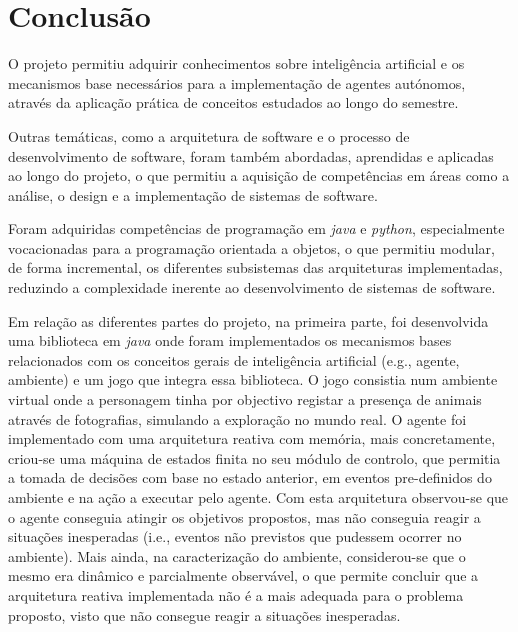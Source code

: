 \chapter{Conclusão}\label{ch:conclusao}

O projeto permitiu adquirir conhecimentos sobre inteligência artificial e os mecanismos base necessários para a implementação de agentes autónomos, através da aplicação prática de conceitos estudados ao longo do semestre.

Outras temáticas, como a arquitetura de software e o processo de desenvolvimento de software, foram também abordadas, aprendidas e aplicadas ao longo do projeto, o que permitiu a aquisição de competências em áreas como a análise, o design e a implementação de sistemas de software.

Foram adquiridas competências de programação em \textit{java} e \textit{python}, especialmente vocacionadas para a programação orientada a objetos, o que permitiu modular, de forma incremental, os diferentes subsistemas das arquiteturas implementadas, reduzindo a complexidade inerente ao desenvolvimento de sistemas de software.

Em relação as diferentes partes do projeto, na primeira parte, foi desenvolvida uma biblioteca em \textit{java} onde foram implementados os mecanismos bases relacionados com os conceitos gerais de inteligência artificial (e.g., agente, ambiente) e um jogo que integra essa biblioteca.
O jogo consistia num ambiente virtual onde a personagem tinha por objectivo registar a presença de animais através de fotografias, simulando a exploração no mundo real.
O agente foi implementado com uma arquitetura reativa com memória, mais concretamente, criou-se uma máquina de estados finita no seu módulo de controlo, que permitia a tomada de decisões com base no estado anterior, em eventos pre-definidos do ambiente e na ação a executar pelo agente.
Com esta arquitetura observou-se que o agente conseguia atingir os objetivos propostos, mas não conseguia reagir a situações inesperadas (i.e., eventos não previstos que pudessem ocorrer no ambiente).
Mais ainda, na caracterização do ambiente, considerou-se que o mesmo era dinâmico e parcialmente observável, o que permite concluir que a arquitetura reativa implementada não é a mais adequada para o problema proposto, visto que não consegue reagir a situações inesperadas.

